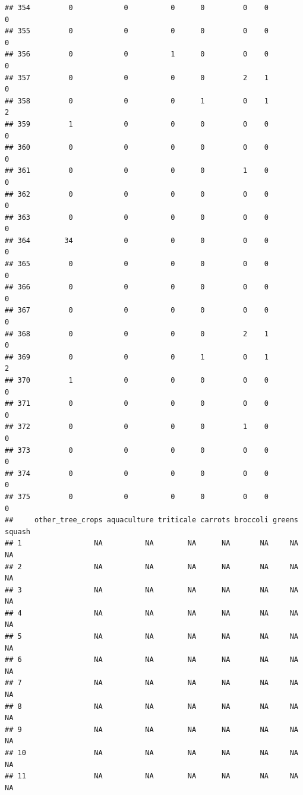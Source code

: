 \documentclass[
]{article}
\begin{document}
\begin{verbatim}
## 354         0            0          0      0         0    0              0
## 355         0            0          0      0         0    0              0
## 356         0            0          1      0         0    0              0
## 357         0            0          0      0         2    1              0
## 358         0            0          0      1         0    1              2
## 359         1            0          0      0         0    0              0
## 360         0            0          0      0         0    0              0
## 361         0            0          0      0         1    0              0
## 362         0            0          0      0         0    0              0
## 363         0            0          0      0         0    0              0
## 364        34            0          0      0         0    0              0
## 365         0            0          0      0         0    0              0
## 366         0            0          0      0         0    0              0
## 367         0            0          0      0         0    0              0
## 368         0            0          0      0         2    1              0
## 369         0            0          0      1         0    1              2
## 370         1            0          0      0         0    0              0
## 371         0            0          0      0         0    0              0
## 372         0            0          0      0         1    0              0
## 373         0            0          0      0         0    0              0
## 374         0            0          0      0         0    0              0
## 375         0            0          0      0         0    0              0
##     other_tree_crops aquaculture triticale carrots broccoli greens squash
## 1                 NA          NA        NA      NA       NA     NA     NA
## 2                 NA          NA        NA      NA       NA     NA     NA
## 3                 NA          NA        NA      NA       NA     NA     NA
## 4                 NA          NA        NA      NA       NA     NA     NA
## 5                 NA          NA        NA      NA       NA     NA     NA
## 6                 NA          NA        NA      NA       NA     NA     NA
## 7                 NA          NA        NA      NA       NA     NA     NA
## 8                 NA          NA        NA      NA       NA     NA     NA
## 9                 NA          NA        NA      NA       NA     NA     NA
## 10                NA          NA        NA      NA       NA     NA     NA
## 11                NA          NA        NA      NA       NA     NA     NA

\end{verbatim}
\end{document}
